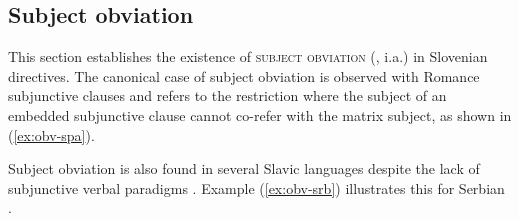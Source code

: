 \documentclass[output=paper,colorlinks,citecolor=brown]{langscibook}
\begin{document}

\subsection{Subject obviation}
\label{subsec:obviation}

This section establishes the existence of \textsc{subject obviation} (\citealt{bouchard82,picallo85,kempchinsky86,kempchinsky09,farkas92}, i.a.) in Slovenian directives. The canonical case of subject obviation is observed with Romance subjunctive clauses and refers to the restriction where the subject of an embedded subjunctive clause cannot co-refer with the matrix subject, as shown in (\ref{ex:obv-spa}).    

\z

\noindent Subject obviation is also found in several Slavic languages despite the lack of subjunctive verbal paradigms \citep[see][]{socanac17}. Example (\ref{ex:obv-srb}) illustrates this for Serbian \citep[see][]{zec87,farkas92,socanac17,kaufmannetal23}.

\z
\end{document}
